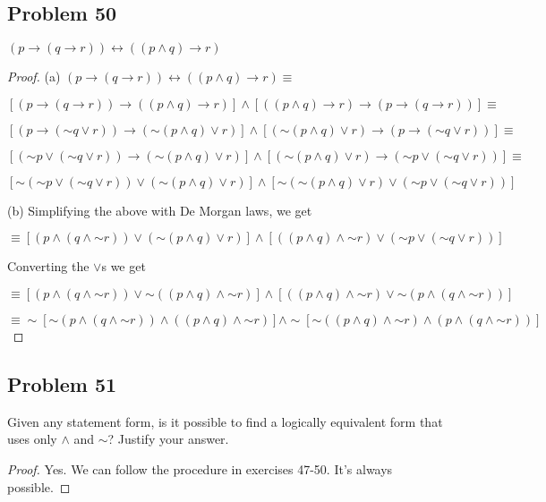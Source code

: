 \documentclass[14pt]{extarticle}
\newcommand{\bic}{\leftrightarrow}
\begin{document}
\subsection{Problem 50}
$(p \to (q \to r)) \bic ((p \wedge q) \to r)$
\begin{proof}
(a) $(p \to (q \to r)) \bic ((p \wedge q) \to r) \equiv $

$[(p \to (q \to r)) \to ((p \wedge q) \to r)] \wedge [((p \wedge q) \to r) \to (p \to (q \to r))] \equiv$

$[(p \to ({\sim q} \vee r)) \to ({\sim (p \wedge q)} \vee r)] \wedge [({\sim (p \wedge q)} \vee r) \to (p \to ({\sim q} \vee r))] \equiv$

$[({\sim p} \vee ({\sim q} \vee r)) \to ({\sim (p \wedge q)} \vee r)] \wedge [({\sim (p \wedge q)} \vee r) \to ({\sim p} \vee ({\sim q} \vee r))] \equiv$

$[{\sim ({\sim p} \vee ({\sim q} \vee r))} \vee ({\sim (p \wedge q)} \vee r)] \wedge [{\sim ({\sim (p \wedge q)} \vee r)} \vee ({\sim p} \vee ({\sim q} \vee r))]$

(b) Simplifying the above with De Morgan laws, we get

$\equiv [(p \wedge (q \wedge {\sim r})) \vee ({\sim (p \wedge q)} \vee r)] \wedge [((p \wedge q) \wedge {\sim r}) \vee ({\sim p} \vee ({\sim q} \vee r))]$

Converting the $\vee$s we get

$\equiv [(p \wedge (q \wedge {\sim r})) \vee {\sim((p \wedge q) \wedge {\sim r})}] \wedge [((p \wedge q) \wedge {\sim r}) \vee {\sim(p \wedge (q \wedge {\sim r}))}]$

$\equiv \sim[{\sim (p \wedge (q \wedge {\sim r}))} \wedge ((p \wedge q) \wedge {\sim r})] \wedge \sim[{\sim ((p \wedge q) \wedge {\sim r})} \wedge (p \wedge (q \wedge {\sim r}))]$
\end{proof}

\subsection{Problem 51}
Given any statement form, is it possible to find a logically equivalent form that uses only $\wedge$ and $\sim$? Justify your answer.

\begin{proof}
Yes. We can follow the procedure in exercises 47-50. It's always possible.
\end{proof}
\end{document}
